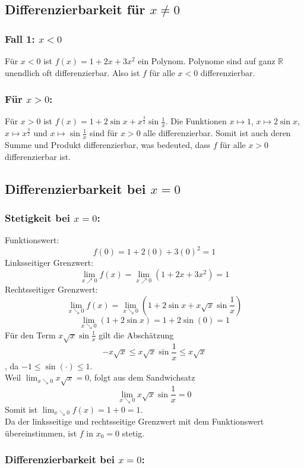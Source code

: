 \documentclass{article}
\begin{document}
\subsection*{Differenzierbarkeit für \(x \ne 0\)}
\subsubsection*{Fall 1: \(x < 0\)}
Für \(x < 0\) ist \(f(x) = 1 + 2x + 3x^2\) ein Polynom. Polynome sind auf ganz \(\mathbb{R}\) unendlich oft differenzierbar. Also ist \(f\) für alle \(x < 0\) differenzierbar.
\subsubsection*{Für \(x > 0\):}
Für \(x > 0\) ist \(f(x) = 1 + 2\sin x + x^{\frac{3}{2}}\sin\frac{1}{x}\). Die Funktionen \(x \mapsto 1\), \(x \mapsto 2\sin x\), \(x \mapsto x^{\frac{3}{2}}\) und \(x \mapsto \sin\frac{1}{x}\) sind für \(x > 0\) alle differenzierbar. Somit ist auch deren Summe und Produkt differenzierbar, was bedeuted, dass \(f\) für alle \(x > 0\) differenzierbar ist.


\subsection*{Differenzierbarkeit bei \(x = 0\)}
\subsubsection*{Stetigkeit bei \(x=0\):}
Funktionswert: 
\[f(0) = 1 + 2(0) + 3(0)^2 = 1\]
Linksseitiger Grenzwert: 
\[\lim_{x\nearrow0} f(x) = \lim_{x\nearrow0} (1+2x+3x^2) = 1\]
Rechtsseitiger Grenzwert: 
\[\lim_{x\searrow0} f(x) = \lim_{x\searrow0} (1 + 2\sin x + x\sqrt{x}\sin\frac{1}{x})\]
\[\lim_{x\searrow0} (1 + 2\sin x) = 1 + 2\sin(0) = 1\]
Für den Term \(x\sqrt{x}\sin\frac{1}{x}\) gilt die Abschätzung 
\[-x\sqrt{x} \le x\sqrt{x}\sin\frac{1}{x} \le x\sqrt{x}\]
, da \(-1 \le \sin(\cdot) \le 1\). \\
Weil \(\lim_{x\searrow0} x\sqrt{x} = 0\), folgt aus dem Sandwichsatz  
\[\lim_{x\searrow0} x\sqrt{x}\sin\frac{1}{x} = 0\]
Somit ist \(\lim_{x\searrow0} f(x) = 1 + 0 = 1\). \\
Da der linksseitige und rechtsseitige Grenzwert mit dem Funktionswert übereinstimmen, ist \(f\) in \(x_0=0\) stetig.

\subsubsection*{Differenzierbarkeit bei \(x=0\):} 
\end{document}
